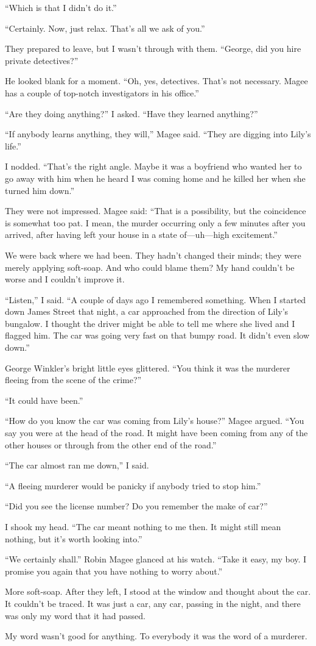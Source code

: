 \documentclass{novel}
\begin{document}
{“Which is that I didn’t do it.”

“Certainly. Now, just relax. That’s all we ask of you.”

They prepared to leave, but I wasn’t through with them. “George, did you hire private detectives?”

He looked blank for a moment. “Oh, yes, detectives. That’s not necessary. Magee has a couple of top-notch investigators in his office.”

“Are they doing anything?” I asked. “Have they learned anything?”

“If anybody learns anything, they will,” Magee said. “They are digging into Lily’s life.”

I nodded. “That’s the right angle. Maybe it was a boyfriend who wanted her to go away with him when he heard I was coming home and he killed her when she turned him down.”

They were not impressed. Magee said: “That is a possibility, but the coincidence is somewhat too pat. I mean, the murder occurring only a few minutes after you arrived, after having left your house in a state of—uh—high excitement.”

We were back where we had been. They hadn’t changed their minds; they were merely applying soft-soap. And who could blame them? My hand couldn’t be worse and I couldn’t improve it.

“Listen,” I said. “A couple of days ago I remembered something. When I started down James Street that night, a car approached from the direction of Lily’s bungalow. I thought the driver might be able to tell me where she lived and I flagged him. The car was going very fast on that bumpy road. It didn’t even slow down.”

George Winkler’s bright little eyes glittered. “You think it was the murderer fleeing from the scene of the crime?”

“It could have been.”

“How do you know the car was coming from Lily’s house?” Magee argued. “You say you were at the head of the road. It might have been coming from any of the other houses or through from the other end of the road.”

“The car almost ran me down,” I said.

“A fleeing murderer would be panicky if anybody tried to stop him.”

“Did you see the license number? Do you remember the make of car?”

I shook my head. “The car meant nothing to me then. It might still mean nothing, but it’s worth looking into.”

“We certainly shall.” Robin Magee glanced at his watch. “Take it easy, my boy. I promise you again that you have nothing to worry about.”

More soft-soap. After they left, I stood at the window and thought about the car. It couldn’t be traced. It was just a car, any car, passing in the night, and there was only my word that it had passed.

My word wasn’t good for anything. To everybody it was the word of a murderer.

}
\end{document}
